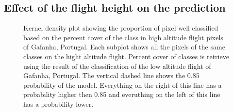 \documentclass[
  number]{elsarticle}
\begin{document}
\subsection{Effect of the flight height on the
prediction}\label{effect-of-the-flight-height-on-the-prediction}

\label{cell-fig-upscaling}
\begin{figure}[H]


\caption{\label{fig-upscaling}Kernel density plot showing the proportion
of pixel well classified based on the percent cover of the class in high
altitude flight pixels of Gafanha, Portugal. Each subplot shows all the
pixels of the same classes on the hight altitude flight. Percent cover
of classes is retrieve using the result of the classification of the low
altitude flight of Gafanha, Portugal. The vertical dashed line shows the
0.85 probability of the model. Everything on the right of this line has
a probability higher then 0.85 and everuthing on the left of this line
has a probability lower.}

\end{figure}%
\end{document}
